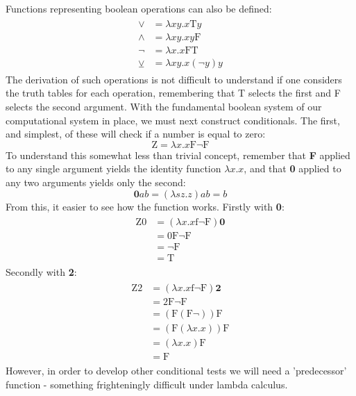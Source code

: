 \documentclass {article}
\begin{document}
Functions representing boolean operations can also be defined:
\begin{gather*}
\begin{aligned}
\vee &= \lambda xy.x\bm{\mathrm{T}}y\\
\wedge &= \lambda xy.xy\bm{\mathrm{F}}\\
\lnot &= \lambda x.x\bm{\mathrm{FT}} \\
\veebar &= \lambda xy.x(\lnot y)y
\end{aligned}
\end{gather*}
The derivation of such operations is not difficult to understand if one considers the truth tables for each operation, remembering that T selects the first and F selects the second argument.
With the fundamental boolean system of our computational system in place, we must next construct conditionals. The first, and simplest, of these will check if a number is equal to zero:
\begin{equation*}
\bm{\mathrm{Z}} = \lambda x.x\bm{\mathrm{F\lnot F}}
\end{equation*}
To understand this somewhat less than trivial concept, remember that \textbf{F} applied to any single argument yields the identity function $\lambda x.x$, and that \textbf{0} applied to any two arguments yields only the second:
\begin{equation*}
\bm{0}ab = (\lambda sz.z)ab = b
\end{equation*}
From this, it easier to see how the function works. Firstly with \textbf{0}:
\begin{gather*}
\begin{aligned}
\bm{\mathrm{Z0}} &= (\lambda x.x\bm{\mathrm{f\lnot F}})\bm{0}\\
&= \bm{\mathrm{0F\lnot F}}\\
&= \bm{\mathrm{\lnot F}}\\
&= \bm{\mathrm{T}}
\end{aligned}
\end{gather*}
Secondly with \textbf{2}:
\begin{gather*}
\begin{aligned}
\bm{\mathrm{Z2}} &= (\lambda x.x\bm{\mathrm{f\lnot F}})\bm{2}\\
&= \bm{\mathrm{2F\lnot F}}\\
&= (\bm{\mathrm{F}}(\bm{\mathrm{F}}\lnot)) \bm{\mathrm{F}}\\
&= (\bm{\mathrm{F}}(\lambda x.x))\bm{\mathrm{F}}\\
&= (\lambda x.x)\bm{\mathrm{F}}\\
&= \bm{\mathrm{F}} 
\end{aligned}
\end{gather*}
However, in order to develop other conditional tests we will need a 'predecessor' function - something frighteningly difficult under lambda calculus.
\end{document}
